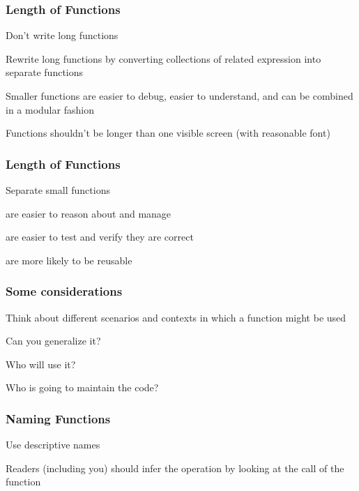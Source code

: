 \documentclass[12pt]{beamer}\usepackage[]{graphicx}\usepackage[]{color}
\begin{document}

\begin{frame}
\frametitle{Length of Functions}

\bi
 \item Don't write long functions
 \item Rewrite long functions by converting collections 
 of related expression into separate functions
 \item Smaller functions are easier to debug, easier to understand, 
 and can be combined in a modular fashion
 \item Functions shouldn't be longer than one visible screen 
 (with reasonable font)
\ei

\end{frame}


\begin{frame}
\frametitle{Length of Functions}

\bi
 \item Separate small functions
 \item are easier to reason about and manage
 \item are easier to test and verify they are correct
 \item are more likely to be reusable
\ei

\end{frame}


\begin{frame}
\frametitle{Some considerations}

\bi
 \item Think about different scenarios and contexts in which a function might be used
 \item Can you generalize it?
 \item Who will use it?
 \item Who is going to maintain the code?
\ei

\end{frame}


\begin{frame}
\frametitle{Naming Functions}

\bi
  \item Use descriptive names
  \item Readers (including you) should infer the operation by looking at the call of the function
\ei

\end{frame}
\end{document}
